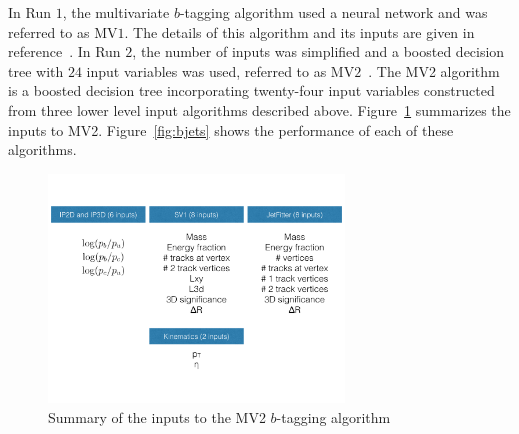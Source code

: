In Run $1$, the multivariate $b$-tagging algorithm used a neural network and was referred to as MV$1$. The details of this algorithm and its inputs are given in reference~\cite{Run1BJets}. In Run $2$, the number of inputs was simplified and a boosted decision tree with $24$ input variables was used, referred to as MV$2$~\cite{Run2BJets}. The MV2 algorithm is a boosted decision tree incorporating twenty-four input variables constructed from three lower level input algorithms described above. Figure~\ref{fig:MV2inputs} summarizes the inputs to MV2. Figure~\ref{fig:bjets} shows the performance of each of these algorithms. 

\begin{figure}[h!]
  \centering
  \captionsetup{justification=centering}

  \includegraphics[width=0.7\textwidth]{figures/MV2_inputs}
  \caption{Summary of the inputs to the MV2 $b$-tagging algorithm}
  \label{fig:MV2inputs}
\end{figure}


